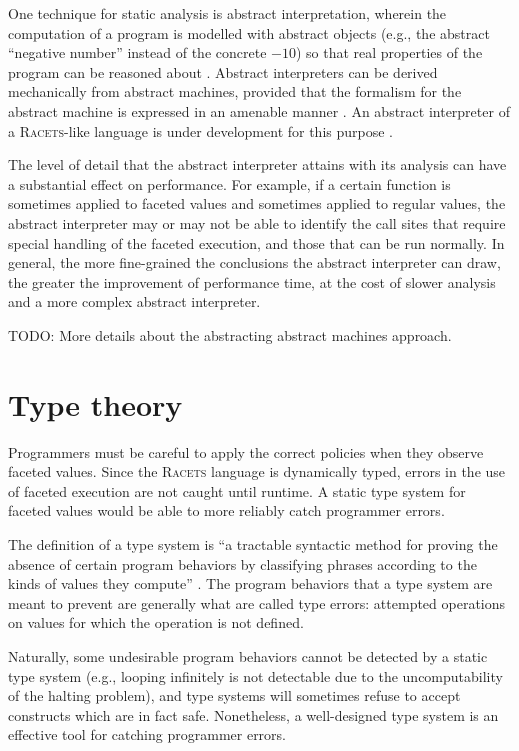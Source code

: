\documentclass{article}
\begin{document}
One technique for static analysis is abstract interpretation, wherein the computation of a program is modelled with abstract objects (e.g., the abstract ``negative number'' instead of the concrete $-10$) so that real properties of the program can be reasoned about \cite{ai-original}. Abstract interpreters can be derived mechanically from abstract machines, provided that the formalism for the abstract machine is expressed in an amenable manner \cite{aam}. An abstract interpreter of a \textsc{Racets}-like language is under development for this purpose \cite{abstract-inter}.

The level of detail that the abstract interpreter attains with its analysis can have a substantial effect on performance. For example, if a certain function is sometimes applied to faceted values and sometimes applied to regular values, the abstract interpreter may or may not be able to identify the call sites that require special handling of the faceted execution, and those that can be run normally. In general, the more fine-grained the conclusions the abstract interpreter can draw, the greater the improvement of performance time, at the cost of slower analysis and a more complex abstract interpreter.

TODO: More details about the abstracting abstract machines approach.



\section{Type theory}
Programmers must be careful to apply the correct policies when they observe faceted values. Since the \textsc{Racets} language is dynamically typed, errors in the use of faceted execution are not caught until runtime. A static type system for faceted values would be able to more reliably catch programmer errors.

The definition of a type system is ``a tractable syntactic method for proving the absence of certain program behaviors by classifying phrases according to the kinds of values they compute'' \cite{types}. The program behaviors that a type system are meant to prevent are generally what are called type errors: attempted operations on values for which the operation is not defined.

Naturally, some undesirable program behaviors cannot be detected by a static type system (e.g., looping infinitely is not detectable due to the uncomputability of the halting problem), and type systems will sometimes refuse to accept constructs which are in fact safe. Nonetheless, a well-designed type system is an effective tool for catching programmer errors.
\end{document}
